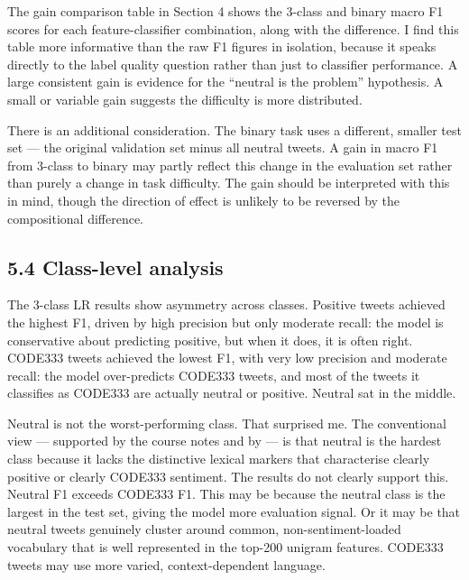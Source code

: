 \documentclass[12pt]{article}
\begin{document}
The gain comparison table in Section 4 shows the 3-class and binary macro F1 scores for each feature-classifier combination, along with the difference. I find this table more informative than the raw F1 figures in isolation, because it speaks directly to the label quality question rather than just to classifier performance. A large consistent gain is evidence for the ``neutral is the problem'' hypothesis. A small or variable gain suggests the difficulty is more distributed.



There is an additional consideration. The binary task uses a different, smaller test set --- the original validation set minus all neutral tweets. A gain in macro F1 from 3-class to binary may partly reflect this change in the evaluation set rather than purely a change in task difficulty. The gain should be interpreted with this in mind, though the direction of effect is unlikely to be reversed by the compositional difference.



\subsection*{5.4 Class-level analysis}



The 3-class LR results show asymmetry across classes. Positive tweets achieved the highest F1, driven by high precision but only moderate recall: the model is conservative about predicting positive, but when it does, it is often right. CODE333 tweets achieved the lowest F1, with very low precision and moderate recall: the model over-predicts CODE333 tweets, and most of the tweets it classifies as CODE333 are actually neutral or positive. Neutral sat in the middle.



Neutral is not the worst-performing class. That surprised me. The conventional view --- supported by the course notes and by \citet{kenyondean2018sentiment} --- is that neutral is the hardest class because it lacks the distinctive lexical markers that characterise clearly positive or clearly CODE333 sentiment. The results do not clearly support this. Neutral F1 exceeds CODE333 F1. This may be because the neutral class is the largest in the test set, giving the model more evaluation signal. Or it may be that neutral tweets genuinely cluster around common, non-sentiment-loaded vocabulary that is well represented in the top-200 unigram features. CODE333 tweets may use more varied, context-dependent language.
\end{document}
